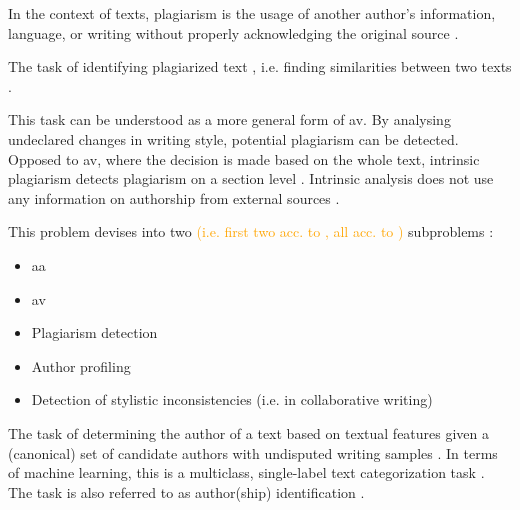 \begin{definition}
    [Plagiarism]
    In the context of texts, plagiarism is the usage of another author's information, language, or writing without properly acknowledging the original source \cite{stein_intrinsic_2011}.
\end{definition}

\begin{definition}
    The task of identifying plagiarized text \cite{stein_intrinsic_2011}, i.e. finding similarities between two texts \cite{stamatatos_survey_2009}.
\end{definition}

\begin{definition}
    This task can be understood as a more general form of \ac{av}.
    By analysing undeclared changes in writing style, potential plagiarism can be detected.
    Opposed to \ac{av}, where the decision is made based on the whole text, 
    intrinsic plagiarism detects plagiarism on a section level \cite{stein_intrinsic_2011}.
    Intrinsic analysis does not use any information on authorship from external sources \cite{zangerle_overview_2024}.
\end{definition}

\begin{definition}
    This problem devises into two \textcolor{orange}{(i.e. first two acc. to \cite{stein_intrinsic_2011}, all acc. to \cite{stamatatos_survey_2009})} subproblems \cite{stein_intrinsic_2011}:
    \begin{itemize}
        \item \ac{aa} \cite{stein_intrinsic_2011}
        \item \ac{av} \cite{stein_intrinsic_2011,stamatatos_survey_2009}
        \item Plagiarism detection \cite{stamatatos_survey_2009}
        \item Author profiling \cite{stamatatos_survey_2009}
        \item Detection of stylistic inconsistencies (i.e. in collaborative writing) \cite{stamatatos_survey_2009}
    \end{itemize}
\end{definition}

\begin{definition}
    [\ac{aa}]   %
    The task of determining the author of a text based on textual features 
    given a (canonical) set of candidate authors with undisputed writing samples \cite{stein_intrinsic_2011,stamatatos_survey_2009,tyo_state_2022}.
    In terms of machine learning, this is a multiclass, single-label text categorization task \cite{stamatatos_survey_2009}.
    The task is also referred to as author(ship) identification \cite{stamatatos_survey_2009}.
\end{definition}


